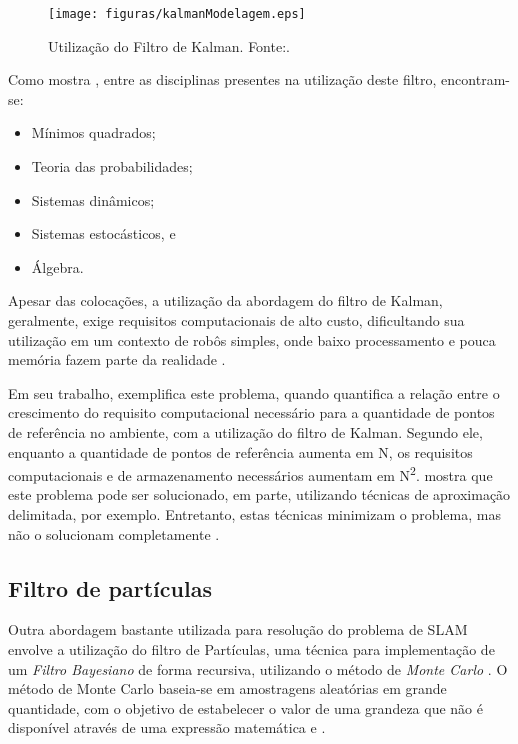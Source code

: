 \begin{figure}[H]
	\centering
	\texttt{[image: figuras/kalmanModelagem.eps]}
	\caption[Utilização do Filtro de Kalman]{Utilização do Filtro de Kalman. Fonte:\cite{agenteExploratorioKalman}.}
	\label{img:kalmanModelagem}
\end{figure}

Como mostra \cite{theCleaningProject}, entre as disciplinas presentes na utilização deste filtro, encontram-se:
\begin{itemize}
	\item Mínimos quadrados;
	\item Teoria das probabilidades;
	\item Sistemas dinâmicos;
	\item Sistemas estocásticos, e
	\item Álgebra.
\end{itemize}

Apesar das colocações, a utilização da abordagem do filtro de Kalman, geralmente, exige requisitos computacionais de alto custo, dificultando sua utilização em um contexto de robôs simples, onde baixo processamento e pouca memória fazem parte da realidade \cite{agenteExploratorioKalman}.

 Em seu trabalho, \cite{slamProblem} exemplifica este problema, quando quantifica a relação entre o crescimento do requisito computacional necessário para a quantidade de pontos de referência no ambiente, com a utilização do filtro de Kalman. Segundo ele, enquanto a quantidade de pontos de referência aumenta em N, os requisitos computacionais e de armazenamento necessários aumentam em N\textsuperscript{2}. \cite{slamProblem} mostra que este problema pode ser solucionado, em parte, utilizando técnicas de aproximação delimitada, por exemplo. Entretanto, estas técnicas minimizam o problema, mas não o solucionam completamente \cite{slamProblem}.


 \subsection{Filtro de partículas} %
 \label{sub:filtro_de_partículas}

Outra abordagem bastante utilizada para resolução do problema de SLAM envolve a utilização do filtro de Partículas, uma técnica para implementação de um \textit{Filtro Bayesiano} de forma recursiva, utilizando o método de \textit{Monte Carlo} \cite{integrationVisionSLAMnonlinear}. O método de Monte Carlo baseia-se em amostragens aleatórias em grande quantidade, com o objetivo de estabelecer o valor de uma grandeza que não é disponível através de uma expressão matemática \cite{mooney1997monte} e \cite{comparacaoKalmanParticulas}.


